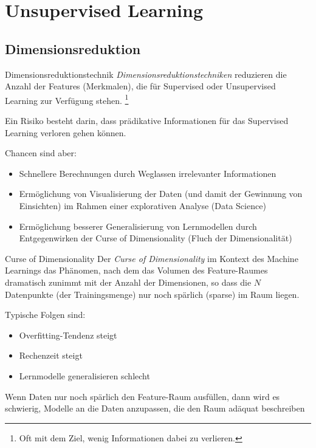 \section{Unsupervised Learning}

\subsection{Dimensionsreduktion}

\begin{defi}{Dimensionsreduktionstechnik}
    \emph{Dimensionsreduktionstechniken} reduzieren die Anzahl der Features (Merkmalen), die für Supervised oder Unsupervised Learning zur Verfügung stehen.
    \footnote{
        Oft mit dem Ziel, wenig Informationen dabei zu verlieren.
    }

    Ein Risiko besteht darin, dass prädikative Informationen für das Supervised Learning verloren gehen können.

    Chancen sind aber:
    \begin{itemize}
        \item Schnellere Berechnungen durch Weglassen irrelevanter Informationen
        \item Ermöglichung von Visualisierung der Daten (und damit der Gewinnung von Einsichten) im Rahmen einer explorativen Analyse (Data Science)
        \item Ermöglichung besserer Generalisierung von Lernmodellen durch Entgegenwirken der Curse of Dimensionality (Fluch der Dimensionalität)
    \end{itemize}
\end{defi}

\begin{bonus}{Curse of Dimensionality}
    Der \emph{Curse of Dimensionality} im Kontext des Machine Learnings das Phänomen, nach dem das Volumen des Feature-Raumes dramatisch zunimmt mit der Anzahl der Dimensionen, so dass die $N$ Datenpunkte (der Trainingsmenge) nur noch spärlich (sparse) im Raum liegen.

    Typische Folgen sind:
    \begin{itemize}
        \item Overfitting-Tendenz steigt
        \item Rechenzeit steigt
        \item Lernmodelle generalisieren schlecht
    \end{itemize}

    Wenn Daten nur noch spärlich den Feature-Raum ausfüllen, dann wird es schwierig, Modelle an die Daten anzupassen, die den Raum adäquat beschreiben
\end{bonus}

